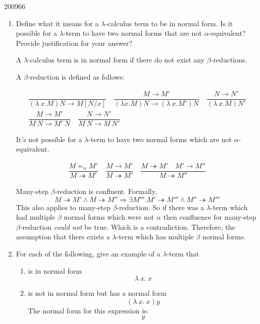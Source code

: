 \documentclass[10pt,\jkfside,a4paper]{article}
\begin{document}
\begin{examquestion}{2009}{6}{6}

\begin{enumerate}

\item Define what it means for a $\lambda$-calculus term to be in normal
form. Is it possible for a $\lambda$-term to have two normal forms that are
not $\alpha$-equivalent? Provide justification for your answer?

A $\lambda$-calculus term is in normal form if there do not exist any
$\beta$-reductions.

A $\beta$-reduction is defined as follows:

\begin{gather*}
\dfrac{}{(\lambda\ x. M)N \to M[N/x]}
\quad
\dfrac{M \to M'}{(\lambda x.M)N\to (\lambda\ x.M')N}
\quad
\dfrac{N \to N'}{(\lambda\ x. M)N'}\\
\dfrac{M \to M'}{M\ N \to M'\ N}
\quad
\dfrac{N \to N'}{M\ N \to M\ N'}
\end{gather*}

It's not possible for a $\lambda$-term to have two normal forms which are
not $\alpha$-equivalent.

\begin{gather}
\dfrac{M =_\alpha M'}{M \twoheadrightarrow M'}
\quad
\dfrac{M \to M'}{M \twoheadrightarrow M'}
\quad
\dfrac{M \twoheadrightarrow M'\quad M' \to M''}{M \twoheadrightarrow M''}
\end{gather}

Many-step $\beta$-reduction is confluent. Formally,
\[
M \twoheadrightarrow M' \wedge M \twoheadrightarrow M'' \Longrightarrow
\exists M'''. M' \twoheadrightarrow M''' \wedge M'' \twoheadrightarrow M'''
\]
This also applies to many-step $\beta$-reduction. So if there was a
$\lambda$-term which had multiple $\beta$ normal forms which were not
$\alpha$ then confluence for many-step $\beta$-reduction \textit{could not}
be true. Which is a contradiction. Therefore, the assumption that there
exists a $\lambda$-term which has multiple $\beta$ normal forms.

\item For each of the following, give an example of a $\lambda$-term that

\begin{enumerate}

\item is in normal form
\[
\lambda\ x.\ x
\]

\item is not in normal form but has a normal form
\[
(\lambda\ x.\ x)y
\]
The normal form for this expression is:
\[
y
\]


\end{enumerate}
\end{enumerate}
\end{examquestion}
\end{document}
